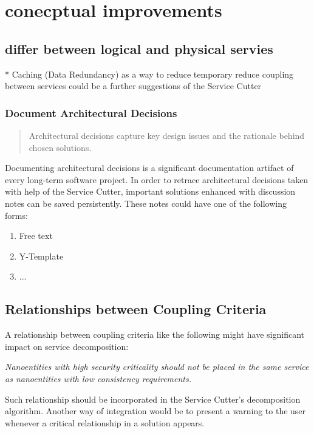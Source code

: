 \section{conecptual improvements}

\subsection{differ between logical and physical servies}

* Caching (Data Redundancy) as a way to reduce temporary reduce coupling between services could be a further suggestions of the Service Cutter

\subsubsection{Document Architectural Decisions}

\begin{quote}
	Architectural decisions capture key design issues and the rationale behind chosen solutions.\cite{zioAD}
\end{quote}

Documenting architectural decisions is a significant documentation artifact of every long-term software project. In order to retrace architectural decisions taken with help of the Service Cutter, important solutions enhanced with discussion notes can be saved persistently. These notes could have one of the following forms:

\begin{enumerate}
	\item Free text
	\item Y-Template\cite{zimmermann2012yTemplate}
	\item ... %
\end{enumerate}

\subsection{Relationships between Coupling Criteria}

A relationship between coupling criteria like the following might have significant impact on service decomposition:

\textit{Nanoentities with high security criticality should not be placed in the same service as nanoentities with low consistency requirements.}

Such relationship should be incorporated in the Service Cutter's decomposition algorithm. Another way of integration would be to present a warning to the user whenever a critical relationship in a solution appears.






